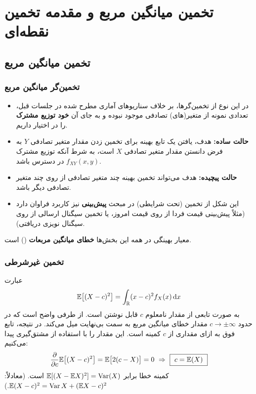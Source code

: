 \chapter{تخمین میانگین مربع و مقدمه تخمین نقطه‌ای}

\section{تخمین میانگین مربع }

\subsection{تخمین‌گر میانگین مربع}
\begin{itemize}
\item در این نوع از تخمین‌گرها، بر خلاف سناریوهای آماری مطرح شده در جلسات قبل، تعدادی نمونه از متغیر(های) تصادفی موجود نبوده و به جای آن \textbf{خود توزیع مشترک} را در اختیار داریم.
\item \textcolor{red!70!black}{\textbf{حالت ساده:}} هدف، یافتن یک تابع بهینه برای تخمین زدن مقدار متغیر تصادفی $Y$ به فرض دانستن مقدار متغیر تصادفی $X$ است، به شرط آنکه توزیع مشترک $f_{XY}(x,y)$ در دسترس باشد.
\item \textcolor{red!70!black}{\textbf{حالت پیچیده:}} هدف می‌تواند تخمین بهینه چند متغیر تصادفی از روی چند متغیر تصادفی دیگر باشد.
\item این شکل از تخمین (تحت شرایطی) در مبحث \textbf{پیش‌بینی} نیز کاربرد فراوان دارد (مثلاً پیش‌بینی قیمت فردا از روی قیمت امروز، یا تخمین سیگنال ارسالی از روی سیگنال نویزی دریافتی).
\end{itemize}
معیار بهینگی در همه این بخش‌ها \textbf{خطای میانگین مربعات} () است.

\subsection{تخمین غیرشرطی }
\begin{question}[{متغیر تصادفی $X$ با چگالی معلوم $f_X(x)$ را در نظر بگیرید. می‌خواهیم آن را با مقدار ثابت $c$ تخمین بزنیم؛ $c$ را چنان بیابید که $\mathrm{MSE}=\E[(X-c)^2]$ کمینه شود.}]
\begin{answer}
عبارت
\[
\mathbb{E}\big[(X-c)^2\big]=\int_{\mathbb{R}}(x-c)^2f_X(x)\,\mathrm{d} x
\]
به صورت تابعی از مقدار نامعلوم $c$ قابل نوشتن است. از طرفی واضح است که در حدود $c\to\pm\infty$ مقدار خطای میانگین مربع به سمت بی‌نهایت میل می‌کند. در نتیجه، تابع فوق به ازای مقداری از $c$ کمینه است. این مقدار را با استفاده از مشتق‌گیری پیدا می‌کنیم:
\[
\frac{\partial}{\partial c}\E\big[(X-c)^2\big]=\E\big[2(c-X)\big]=0\ \Rightarrow\ \boxed{\ c=\E(X)\ }
\]
کمینه خطا برابر $\mathbb{E}[(X-\mathbb{E} X)^2]=\operatorname{Var}(X)$ است. (معادلاً: $\mathbb{E}(X-c)^2=\operatorname{Var} X+(\mathbb{E} X-c)^2$.)
\end{answer}
\end{question}


